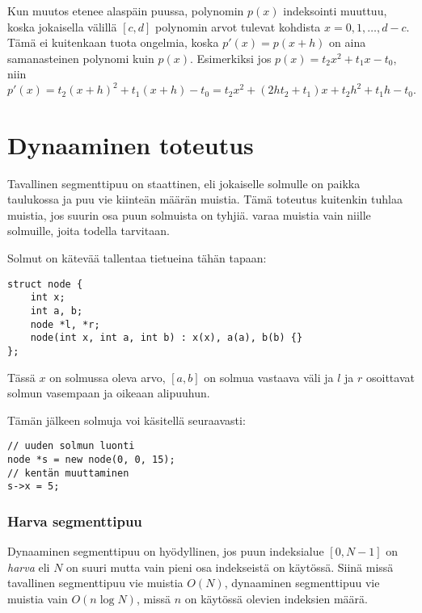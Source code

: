 Kun muutos etenee alaspäin puussa,
polynomin $p(x)$ indeksointi muuttuu,
koska jokaisella välillä $[c,d]$
polynomin arvot tulevat kohdista $x=0,1,\ldots,d-c$.
Tämä ei kuitenkaan tuota ongelmia,
koska $p'(x)=p(x+h)$ on aina
samanasteinen polynomi kuin $p(x)$.
Esimerkiksi jos $p(x)=t_2 x^2+t_1 x-t_0$, niin
\[p'(x)=t_2(x+h)^2+t_1(x+h)-t_0=t_2 x^2 + (2ht_2+t_1)x+t_2h^2+t_1h-t_0.\]

\section{Dynaaminen toteutus}


Tavallinen segmenttipuu on staattinen,
eli jokaiselle solmulle on paikka taulukossa
ja puu vie kiinteän määrän muistia.
Tämä toteutus kuitenkin tuhlaa muistia,
jos suurin osa puun solmuista on tyhjiä.
 varaa muistia vain
niille solmuille, joita todella tarvitaan.

Solmut on kätevää tallentaa tietueina tähän tapaan:

\begin{lstlisting}
struct node {
    int x;
    int a, b;
    node *l, *r;
    node(int x, int a, int b) : x(x), a(a), b(b) {}
};
\end{lstlisting}
Tässä $x$ on solmussa oleva arvo,
$[a,b]$ on solmua vastaava väli
ja $l$ ja $r$ osoittavat
solmun vasempaan ja oikeaan alipuuhun.

Tämän jälkeen solmuja voi käsitellä seuraavasti:

\begin{lstlisting}
// uuden solmun luonti
node *s = new node(0, 0, 15);
// kentän muuttaminen
s->x = 5;
\end{lstlisting}

\subsubsection{Harva segmenttipuu}


Dynaaminen segmenttipuu on hyödyllinen,
jos puun indeksialue $[0,N-1]$ on \textit{harva}
eli $N$ on suuri mutta vain
pieni osa indekseistä on käytössä.
Siinä missä tavallinen segmenttipuu 
vie muistia $O(N)$,
dynaaminen segmenttipuu vie muistia
vain $O(n \log N)$, missä $n$ on
käytössä olevien indeksien määrä.

